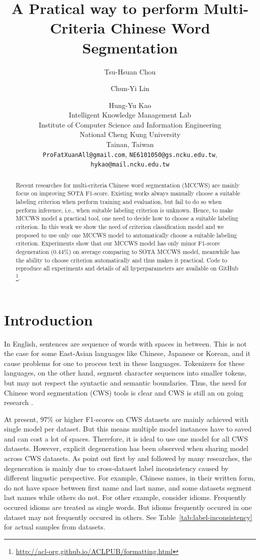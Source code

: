 \documentclass[11pt]{article}
\title{A Pratical way to perform Multi-Criteria Chinese Word Segmentation}
\author{Tsu-Hsuan Chou \and Chun-Yi Lin \and Hung-Yu Kao \\
Intelligent Knowledge Management Lab \\
Institute of Computer Science and Information Engineering \\
National Cheng Kung University \\
Tainan, Taiwan \\
  \texttt{ProFatXuanAll@gmail.com}, \texttt{NE6101050@gs.ncku.edu.tw}, \\
  \texttt{hykao@mail.ncku.edu.tw}
}
\begin{document}
\maketitle
\begin{abstract}
  Recent researches for multi-criteria Chinese word segmentation (MCCWS) are mainly focus on improving SOTA F1-score.
  Existing works always manually choose a suitable labeling criterion when perform training and evaluation, but fail to do so when perform inference, i.e., when suitable labeling criterion is unknown.
  Hence, to make MCCWS model a practical tool, one need to decide how to choose a suitable labeling criterion.
  In this work we show the need of criterion classification model and we proposed to use only one MCCWS model to automatically choose a suitable labeling criterion.
  Experiments show that our MCCWS model has only minor F1-score degeneration (\(0.44\%\)) on average comparing to SOTA MCCWS model, meanwhile has the ability to choose criterion automatically and thus makes it practical.
  Code to reproduce all experiments and details of all hyperparameters are available on GitHub \footnote{\url{http://acl-org.github.io/ACLPUB/formatting.html}}.
\end{abstract}

\section{Introduction}

In English, sentences are sequence of words with spaces in between.
This is not the case for some East-Asian languages like Chinese, Japanese or Korean, and it cause problems for one to process text in these languages.
Tokenizers for these languages, on the other hand, segment character sequences into smaller tokens, but may not respect the syntactic and semantic boundaries.
Thus, the need for Chinese word segmentation (CWS) tools is clear and CWS is still an on going research \citep{chen-etal-2017-adversarial,ma-etal-2018-state,He-2019-effective,Gong-2019-switch,huang-etal-2020-towards,huang-etal-2020-joint-multiple,ke2020unified,qiu-etal-2020-concise,ke-etal-2021-pre,tong-etal-2022-word}.

At present, \(97\%\) or higher F1-scores on CWS datasets are mainly achieved with single model per dataset.
But this means multiple model instances have to saved and can cost a lot of spaces.
Therefore, it is ideal to use one model for all CWS datasets.
However, explicit degeneration has been observed when sharing model across CWS datasets.
As point out first by \citep{chen-etal-2017-adversarial} and followed by many researches, the degeneration is mainly due to cross-dataset label inconsistency caused by different lingustic perspective.
For example, Chinese names, in their written form, do not have space between first name and last name, and some datasets segment last names while others do not.
For other example, consider idioms.
Frequently occured idioms are treated as single words.
But idioms frequently occured in one dataset may not frequently occured in others.
See Table~\ref{tab:label-inconsistency} for actual samples from datasets.
\end{document}
